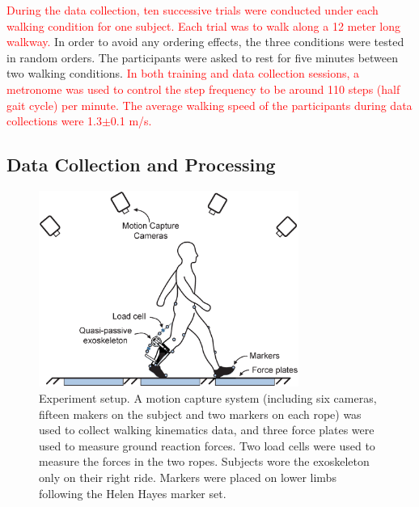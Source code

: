 \documentclass[twocolumn,cleanfoot,10pt]{asme2ej}
\begin{document}
\textcolor{red}{During the data collection, ten successive trials were conducted under each walking condition for one subject.
Each trial was to walk along a 12 meter long walkway.}
In order to avoid any ordering effects, the three conditions were tested in random orders.
The participants were asked to rest for five minutes between two walking conditions.
\textcolor{red}{In both training and data collection sessions, a metronome was used to control the step frequency to be around 110 steps (half gait cycle) per minute.
The average walking speed of the participants during data collections were 1.3$\pm$0.1 m/s.}

\subsection{Data Collection and Processing}

\begin{figure}[bt]
	\centering
	\includegraphics[width=8.5cm]{environment.eps}
	\caption{Experiment setup.
	A motion capture system (including six cameras, fifteen makers on the subject and two markers on each rope) was used to collect walking kinematics data, and three force plates were used to measure ground reaction forces.
	Two load cells were used to measure the forces in the two ropes.
	Subjects wore the exoskeleton only on their right ride.
	Markers were placed on lower limbs following the Helen Hayes marker set.}
	\label{fig:Environment}
\end{figure}
\end{document}
